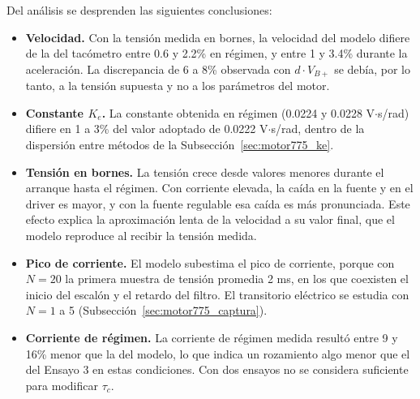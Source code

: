 Del análisis se desprenden las siguientes conclusiones:
\begin{itemize}
\item \textbf{Velocidad.} Con la tensión medida en bornes, la velocidad del modelo difiere de la del tacómetro entre 0.6 y 2.2\% en régimen, y entre 1 y 3.4\% durante la aceleración. La discrepancia de 6 a 8\% observada con $d \cdot V_{B+}$ se debía, por lo tanto, a la tensión supuesta y no a los parámetros del motor.
\item \textbf{Constante $K_e$.} La constante obtenida en régimen (0.0224 y 0.0228 V$\cdot$s/rad) difiere en 1 a 3\% del valor adoptado de 0.0222 V$\cdot$s/rad, dentro de la dispersión entre métodos de la Subsección~\ref{sec:motor775_ke}.
\item \textbf{Tensión en bornes.} La tensión crece desde valores menores durante el arranque hasta el régimen. Con corriente elevada, la caída en la fuente y en el driver es mayor, y con la fuente regulable esa caída es más pronunciada. Este efecto explica la aproximación lenta de la velocidad a su valor final, que el modelo reproduce al recibir la tensión medida.
\item \textbf{Pico de corriente.} El modelo subestima el pico de corriente, porque con $N = 20$ la primera muestra de tensión promedia 2 ms, en los que coexisten el inicio del escalón y el retardo del filtro. El transitorio eléctrico se estudia con $N = 1$ a 5 (Subsección~\ref{sec:motor775_captura}).
\item \textbf{Corriente de régimen.} La corriente de régimen medida resultó entre 9 y 16\% menor que la del modelo, lo que indica un rozamiento algo menor que el del Ensayo 3 en estas condiciones. Con dos ensayos no se considera suficiente para modificar $\tau_c$.
\end{itemize}

